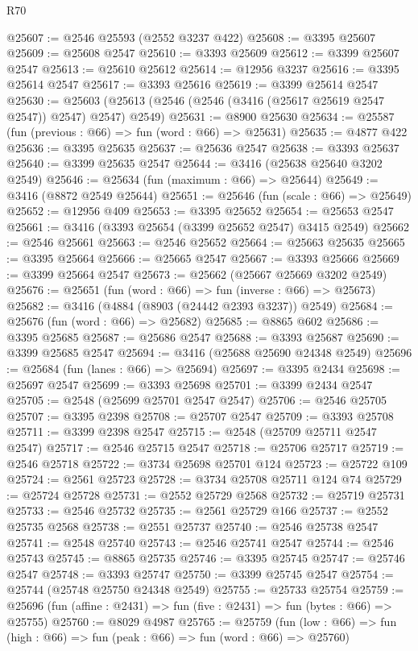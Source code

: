 \begin{lexlean}{R70}
\begin{coremodule}
@25607 := @2546 @25593 (@2552 @3237 @422)
@25608 := @3395 @25607
@25609 := @25608 @2547
@25610 := @3393 @25609
@25612 := @3399 @25607 @2547
@25613 := @25610 @25612
@25614 := @12956 @3237
@25616 := @3395 @25614 @2547
@25617 := @3393 @25616
@25619 := @3399 @25614 @2547
@25630 := @25603 (@25613 (@2546 (@2546 (@3416 (@25617 @25619 @2547 @2547)) @2547) @2547) @2549)
@25631 := @8900 @25630
@25634 := @25587 (fun (previous : @66) => fun (word : @66) => @25631)
@25635 := @4877 @422
@25636 := @3395 @25635
@25637 := @25636 @2547
@25638 := @3393 @25637
@25640 := @3399 @25635 @2547
@25644 := @3416 (@25638 @25640 @3202 @2549)
@25646 := @25634 (fun (maximum : @66) => @25644)
@25649 := @3416 (@8872 @2549 @25644)
@25651 := @25646 (fun (scale : @66) => @25649)
@25652 := @12956 @409
@25653 := @3395 @25652
@25654 := @25653 @2547
@25661 := @3416 (@3393 @25654 (@3399 @25652 @2547) @3415 @2549)
@25662 := @2546 @25661
@25663 := @2546 @25652
@25664 := @25663 @25635
@25665 := @3395 @25664
@25666 := @25665 @2547
@25667 := @3393 @25666
@25669 := @3399 @25664 @2547
@25673 := @25662 (@25667 @25669 @3202 @2549)
@25676 := @25651 (fun (word : @66) => fun (inverse : @66) => @25673)
@25682 := @3416 (@4884 (@8903 (@24442 @2393 @3237)) @2549)
@25684 := @25676 (fun (word : @66) => @25682)
@25685 := @8865 @602
@25686 := @3395 @25685
@25687 := @25686 @2547
@25688 := @3393 @25687
@25690 := @3399 @25685 @2547
@25694 := @3416 (@25688 @25690 @24348 @2549)
@25696 := @25684 (fun (lanes : @66) => @25694)
@25697 := @3395 @2434
@25698 := @25697 @2547
@25699 := @3393 @25698
@25701 := @3399 @2434 @2547
@25705 := @2548 (@25699 @25701 @2547 @2547)
@25706 := @2546 @25705
@25707 := @3395 @2398
@25708 := @25707 @2547
@25709 := @3393 @25708
@25711 := @3399 @2398 @2547
@25715 := @2548 (@25709 @25711 @2547 @2547)
@25717 := @2546 @25715 @2547
@25718 := @25706 @25717
@25719 := @2546 @25718
@25722 := @3734 @25698 @25701 @124
@25723 := @25722 @109
@25724 := @2561 @25723
@25728 := @3734 @25708 @25711 @124 @74
@25729 := @25724 @25728
@25731 := @2552 @25729 @2568
@25732 := @25719 @25731
@25733 := @2546 @25732
@25735 := @2561 @25729 @166
@25737 := @2552 @25735 @2568
@25738 := @2551 @25737
@25740 := @2546 @25738 @2547
@25741 := @2548 @25740
@25743 := @2546 @25741 @2547
@25744 := @2546 @25743
@25745 := @8865 @25735
@25746 := @3395 @25745
@25747 := @25746 @2547
@25748 := @3393 @25747
@25750 := @3399 @25745 @2547
@25754 := @25744 (@25748 @25750 @24348 @2549)
@25755 := @25733 @25754
@25759 := @25696 (fun (affine : @2431) => fun (five : @2431) => fun (bytes : @66) => @25755)
@25760 := @8029 @4987
@25765 := @25759
    (fun (low : @66) => fun (high : @66) => fun (peak : @66) => fun (word : @66) => @25760)

\end{coremodule}
\end{lexlean}
